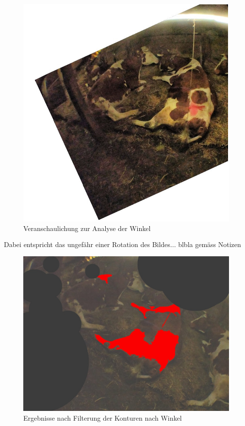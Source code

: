 \begin{figure}[H]
	\center
	\includegraphics[scale=1.8]{Grafiken/entwicklung/21AngleCorrecturDemonstration.jpg}
	\caption{Veranschaulichung zur Analyse der Winkel} 
	\label{fig: Veranschaulichung zur Analyse der Winkel} 
\end{figure}


Dabei entspricht das ungefähr einer Rotation des Bildes... blbla gemäss Notizen

\begin{figure}[H]
	\center
	\includegraphics[scale=0.43]{Grafiken/entwicklung/22AngleCorrectur.jpg}
	\caption{Ergebnisse nach Filterung der Konturen nach Winkel} 
	\label{fig: Ergebnisse nach Filterung der Konturen nach Winkel} 
\end{figure}


